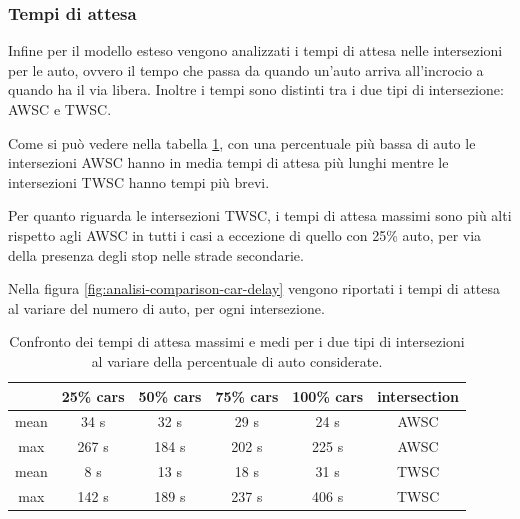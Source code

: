 \pagebreak

\subsubsection*{Tempi di attesa}
Infine per il modello esteso vengono analizzati i tempi di attesa nelle intersezioni per le auto,
ovvero il tempo che passa da quando un'auto arriva all'incrocio a quando ha il via libera. 
Inoltre i tempi sono distinti tra i due tipi di intersezione: AWSC e TWSC.

Come si può vedere nella tabella \ref{tab:analisi-car-delay}, con una percentuale più bassa di auto le intersezioni AWSC 
hanno in media tempi di attesa più lunghi mentre le intersezioni TWSC hanno tempi più brevi.

Per quanto riguarda le intersezioni TWSC, i tempi di attesa massimi sono più alti rispetto agli AWSC in tutti i casi a eccezione di quello con 25\% auto, 
per via della presenza degli stop nelle strade secondarie.

Nella figura \ref{fig:analisi-comparison-car-delay} vengono riportati i tempi di attesa al variare del numero di auto,
per ogni intersezione.



\begin{table}[ht]
    \centering
    \begin{tabular}{|c|c|c|c|c|c|}
    \hline
         & 25\% cars & 50\% cars & 75\% cars & 100\% cars & intersection \\ \hline
    mean & 34 s  & 32 s  & 29 s  & 24 s  & AWSC         \\ \hline
    max  & 267 s & 184 s & 202 s & 225 s & AWSC         \\ \hline
    mean & 8 s   & 13 s  & 18 s  & 31 s  & TWSC         \\ \hline
    max  & 142 s & 189 s & 237 s & 406 s & TWSC         \\ \hline
    \end{tabular}
    \caption{Confronto dei tempi di attesa massimi e medi per i due tipi di intersezioni al variare della percentuale di auto considerate.}
    \label{tab:analisi-car-delay}
\end{table}

\pagebreak

